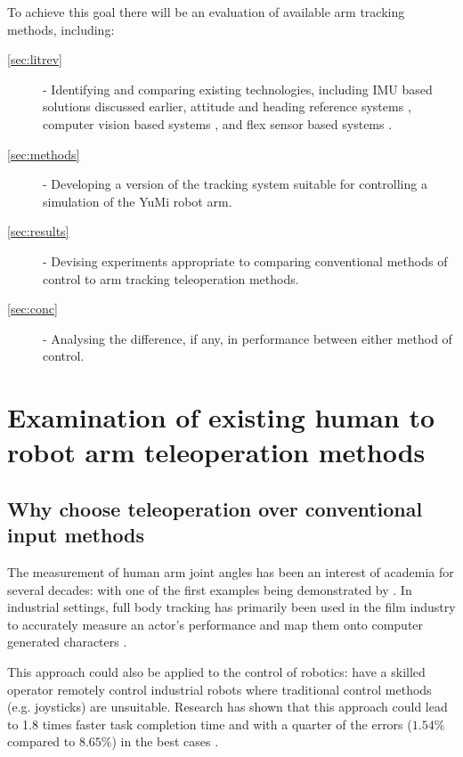   To achieve this goal there will be an evaluation of available arm tracking methods, including:
  \begin{description}
    \item [\autoref{sec:litrev}] - Identifying and comparing existing technologies, including IMU based solutions discussed earlier, attitude and heading reference systems \cite{ref:Mazomenos_Biswas_Cranny_Rajan_Maharatna_Achner_Klemke_Jobges_Ortmann_Langendorfer_2016}, computer vision based systems \cite{ref:Phuong_Cong_2024}, and flex sensor based systems \cite{ref:Nalam_Manivannan_2014}.
    \item [\autoref{sec:methods}] - Developing a version of the tracking system suitable for controlling a simulation of the YuMi robot arm.
    \item [\autoref{sec:results}] - Devising experiments appropriate to comparing conventional methods of control to arm tracking teleoperation methods.
    \item [\autoref{sec:conc}] - Analysing the difference, if any, in performance between either method of control.
  \end{description}

\section{Examination of existing human to robot arm teleoperation methods}
\label{sec:litrev}

  \subsection{Why choose teleoperation over conventional input methods}
    The measurement of human arm joint angles has been an interest of academia for several decades: with one of the first examples being demonstrated by \citeauthor{ref:videobasedumanmotioncapture}. 
    In industrial settings, full body tracking has primarily been used in the film industry to accurately measure an actor's performance \cite{ref:mocapwhy} and map them onto computer generated characters \cite{ref:whatmocap}.
    
    This approach could also be applied to the control of robotics: have a skilled operator remotely control industrial robots where traditional control methods (e.g. joysticks) are unsuitable.
    Research has shown that this approach could lead to \num{1.8} times faster task completion time and with a quarter of the errors (\(1.54 \% \) compared to \(8.65 \% \)) in the best cases  \cite{ref:vranalysis}. 

